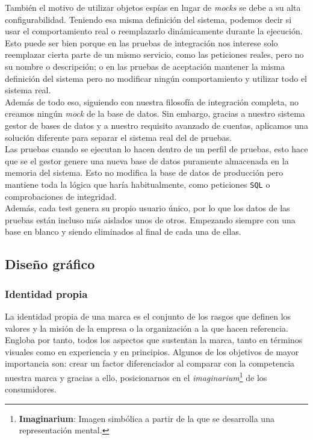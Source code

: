 \documentclass[../ei103948-project-documentation.tex]{subfiles}
\begin{document}
                        También el motivo de utilizar objetos espías en lugar de \textit{mocks} se debe a su alta configurabilidad. Teniendo esa misma definición del sistema, podemos decir si usar el comportamiento real o reemplazarlo dinámicamente durante la ejecución. Esto puede ser bien porque en las pruebas de integración nos interese solo reemplazar cierta parte de un mismo servicio, como las peticiones reales, pero no su nombre o descripción; o en las pruebas de aceptación mantener la misma definición del sistema pero no modificar ningún comportamiento y utilizar todo el sistema real.\\
                        
                        Además de todo eso, siguiendo con nuestra filosofía de integración completa, no creamos ningún \textit{mock} de la base de datos. Sin embargo, gracias a nuestro sistema gestor de bases de datos y a nuestro requisito avanzado de cuentas, aplicamos una solución diferente para separar el sistema real del de pruebas.\\
                        
                        Las pruebas cuando se ejecutan lo hacen dentro de un perfil de pruebas, esto hace que se el gestor genere una nueva base de datos puramente almacenada en la memoria del sistema. Esto no modifica la base de datos de producción pero mantiene toda la lógica que haría habitualmente, como peticiones \texttt{SQL} o comprobaciones de integridad.\\
                        
                        Además, cada test genera su propio usuario único, por lo que los datos de las pruebas están incluso más aislados unos de otros. Empezando siempre con una base en blanco y siendo eliminados al final de cada una de ellas.

                        \subsection{Diseño gráfico}                    
                    
                            \subsubsection{Identidad propia}
                            La identidad propia de una marca es el conjunto de los rasgos que definen los valores y la misión de la empresa o la organización a la que hacen referencia. Engloba por tanto, todos los aspectos que sustentan la marca, tanto en términos visuales como en experiencia y en principios. Algunos de los objetivos de mayor importancia son: crear un factor diferenciador al comparar con la competencia nuestra marca y gracias a ello, posicionarnos en el \textit{imaginarium}\footnote{\textbf{Imaginarium}: Imagen simbólica a partir de la que se desarrolla una representación mental.} de los consumidores.\\
                            
\end{document}

